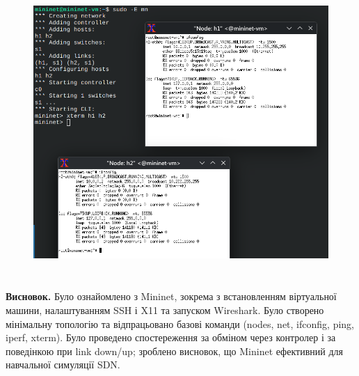 \documentclass[14pt, a4paper]{extreport}
\begin{document}
	\begin{figure}[H]
		\centering
		\includegraphics[height=11cm]{16} 
	\end{figure}
	
	\textbf{Висновок.}
	Було ознайомлено з Mininet, зокрема з встановленням віртуальної машини, налаштуванням SSH і X11 та запуском Wireshark.
	Було створено мінімальну топологію та відпрацьовано базові команди (nodes, net, ifconfig, ping, iperf, xterm).
	Було проведено спостереження за обміном через контролер і за поведінкою при link down/up; зроблено висновок, що Mininet ефективний для навчальної симуляції SDN.
	
\end{document}
